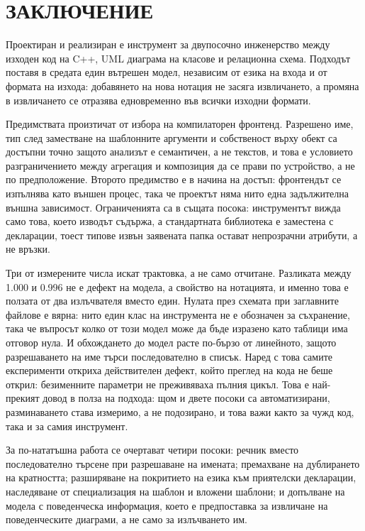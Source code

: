 \section*{ЗАКЛЮЧЕНИЕ}
\label{sec:conclusion}

Проектиран и реализиран е инструмент за двупосочно инженерство между изходен код на C++, UML диаграма
на класове и релационна схема. Подходът поставя в средата един вътрешен модел, независим от езика на
входа и от формата на изхода: добавянето на нова нотация не засяга извличането, а промяна в
извличането се отразява едновременно във всички изходни формати.

Предимствата произтичат от избора на компилаторен фронтенд. Разрешено име, тип след заместване на
шаблонните аргументи и собственост върху обект са достъпни точно защото анализът е семантичен, а не
текстов, и това е условието разграничението между агрегация и композиция да се прави по устройство, а
не по предположение. Второто предимство е в начина на достъп: фронтендът се изпълнява като външен
процес, така че проектът няма нито една задължителна външна зависимост. Ограниченията са в същата
посока: инструментът вижда само това, което изводът съдържа, а стандартната библиотека е заместена с
декларации, тоест типове извън заявената папка остават непрозрачни атрибути, а не връзки.

Три от измерените числа искат трактовка, а не само отчитане. Разликата между 1.000 и 0.996 не е
дефект на модела, а свойство на нотацията, и именно това е ползата от два излъчвателя вместо един.
Нулата през схемата при заглавните файлове е вярна: нито един клас на инструмента не е обозначен за
съхранение, така че въпросът колко от този модел може да бъде изразено като таблици има отговор нула.
И обхождането до модел расте по-бързо от линейното, защото разрешаването на име търси последователно
в списък. Наред с това самите експерименти откриха действителен дефект, който преглед на кода не беше
открил: безименните параметри не преживяваха пълния цикъл. Това е най-прекият довод в полза на
подхода: щом и двете посоки са автоматизирани, разминаването става измеримо, а не подозирано, и това
важи както за чужд код, така и за самия инструмент.

За по-нататъшна работа се очертават четири посоки: речник вместо последователно търсене при
разрешаване на имената; премахване на дублирането на кратността; разширяване на покритието на езика
към приятелски декларации, наследяване от специализация на шаблон и вложени шаблони; и допълване на
модела с поведенческа информация, което е предпоставка за извличане на поведенческите диаграми, а не
само за излъчването им.
